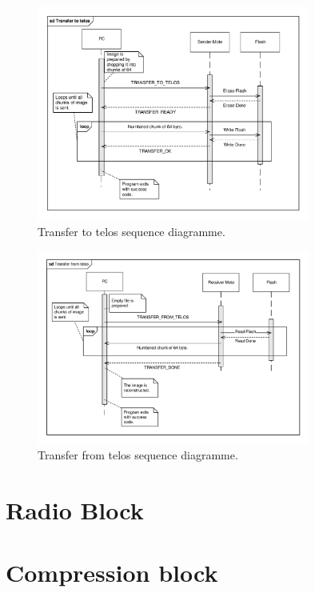 \begin{figure}[H]
	\centering
	\includegraphics[width=0.8\textwidth]{Figures/PCtoTelosb}
	\caption{Transfer to telos sequence diagramme.}
	\label{transfertotelos}
\end{figure}

\begin{figure}[H]
	\centering
	\includegraphics[width=0.8\textwidth]{Figures/PCfromTelosb}
	\caption{Transfer from telos sequence diagramme.}
	\label{transferfromtelos}
\end{figure}

\section{Radio Block}

\section{Compression block}


